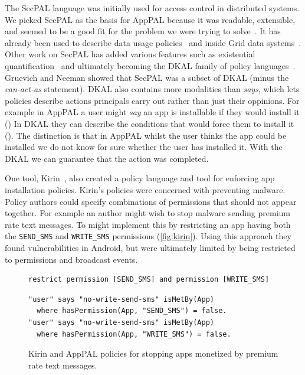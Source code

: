 \documentclass[]{llncs}
\begin{document}
The SecPAL language was initially used for access control in distributed systems.
We picked SecPAL as the basis for AppPAL because it was readable, extensible, and seemed to be a good fit for the problem we were trying to solve~\cite{Hallett:2014un}.
It has already been used to describe data usage policies~\cite{Aziz:2011vt} and inside Grid data systems~\cite{Humphrey:2007wc}.
Other work on SecPAL has added various features such as existential quantification~\cite{Becker:2009vt} and ultimately becoming the DKAL family of policy languages~\cite{Gurevich:2008fz,Gurevich:Qo5E3M3}.
Gruevich and Neeman showed that SecPAL was a subset of DKAL (minus the \emph{can-act-as} statement).
DKAL also contains more modalities than \emph{says}, which lets policies describe actions principals carry out rather than just their oppinions.
For example in AppPAL a user might \emph{say} an app is installable if they would install it ()
In DKAL they can describe the conditions that would force them to install it ().
The distinction is that in AppPAL whilst the user thinks the app could be installed we do not know for sure whether the user has installed it.
With the DKAL we can guarantee that the action was completed.

One tool, Kirin~\cite{Enck:2009ko}, also created a policy language and tool for enforcing app installation policies.
Kirin's policies were concerned with preventing malware.
Policy authors could specify combinations of permissions that should not appear together.
For example an author might wish to stop malware sending premium rate text messages.
To might implement this by restricting an app having both the \texttt{SEND\_SMS} and \texttt{WRITE\_SMS} permissions (\autoref{fig:kirin}).
Using this approach they found vulnerabilities in Android, but were ultimately limited by being restricted to permissions and broadcast events.
\begin{figure}
\begin{lstlisting}
restrict permission [SEND_SMS] and permission [WRITE_SMS]
\end{lstlisting}
\begin{lstlisting}
"user" says "no-write-send-sms" isMetBy(App)
  where hasPermission(App, "SEND_SMS") = false.
"user" says "no-write-send-sms" isMetBy(App)
  where hasPermission(App, "WRITE_SMS") = false.
\end{lstlisting}
\caption{Kirin and AppPAL policies for stopping apps monetized by premium rate text messages.}
\label{fig:kirin}
\end{figure}
\end{document}
